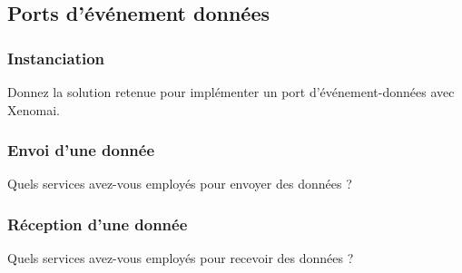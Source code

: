 \documentclass[11pt, a4paper]{paper}
\begin{document}
\subsection{Ports d’événement données}

\subsubsection{Instanciation}
 {\color{blue} Donnez la solution retenue pour implémenter un port d'événement-données avec Xenomai.}

\subsubsection{Envoi d’une donnée}
 {\color{blue} Quels services avez-vous employés pour envoyer des données ?}

\subsubsection{Réception d’une donnée}
 {\color{blue} Quels services avez-vous employés pour recevoir des données ?}
 
\end{document}
